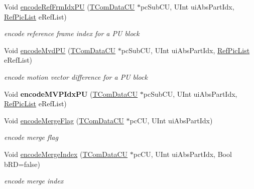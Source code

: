 \begin{DoxyCompactItemize}
Void \hyperlink{class_t_enc_entropy_a418fc6da3be935bad0780f1bc25d0ea0}{encode\+Ref\+Frm\+Idx\+PU} (\hyperlink{class_t_com_data_c_u}{T\+Com\+Data\+CU} $\ast$pc\+Sub\+CU, U\+Int ui\+Abs\+Part\+Idx, \hyperlink{_type_def_8h_a93cea48eb9dcfd661168dee82e41b384}{Ref\+Pic\+List} e\+Ref\+List)
\begin{DoxyCompactList}\small\item\em encode reference frame index for a PU block \end{DoxyCompactList}\item 
\mbox{\label{class_t_enc_entropy_a0b56c9db8fe066e8b5bda554b66e7402}} 
Void \hyperlink{class_t_enc_entropy_a0b56c9db8fe066e8b5bda554b66e7402}{encode\+Mvd\+PU} (\hyperlink{class_t_com_data_c_u}{T\+Com\+Data\+CU} $\ast$pc\+Sub\+CU, U\+Int ui\+Abs\+Part\+Idx, \hyperlink{_type_def_8h_a93cea48eb9dcfd661168dee82e41b384}{Ref\+Pic\+List} e\+Ref\+List)
\begin{DoxyCompactList}\small\item\em encode motion vector difference for a PU block \end{DoxyCompactList}\item 
\mbox{\label{class_t_enc_entropy_a42b735cd050b5e7ebe65fe9ccda434be}} 
Void {\bfseries encode\+M\+V\+P\+Idx\+PU} (\hyperlink{class_t_com_data_c_u}{T\+Com\+Data\+CU} $\ast$pc\+Sub\+CU, U\+Int ui\+Abs\+Part\+Idx, \hyperlink{_type_def_8h_a93cea48eb9dcfd661168dee82e41b384}{Ref\+Pic\+List} e\+Ref\+List)
\item 
\mbox{\label{class_t_enc_entropy_a546f8e7bc80b9bbde75875ce6d795616}} 
Void \hyperlink{class_t_enc_entropy_a546f8e7bc80b9bbde75875ce6d795616}{encode\+Merge\+Flag} (\hyperlink{class_t_com_data_c_u}{T\+Com\+Data\+CU} $\ast$pc\+CU, U\+Int ui\+Abs\+Part\+Idx)
\begin{DoxyCompactList}\small\item\em encode merge flag \end{DoxyCompactList}\item 
\mbox{\label{class_t_enc_entropy_a38ae7546cd038347f41ee84dc8e7714b}} 
Void \hyperlink{class_t_enc_entropy_a38ae7546cd038347f41ee84dc8e7714b}{encode\+Merge\+Index} (\hyperlink{class_t_com_data_c_u}{T\+Com\+Data\+CU} $\ast$pc\+CU, U\+Int ui\+Abs\+Part\+Idx, Bool b\+RD=false)
\begin{DoxyCompactList}\small\item\em encode merge index \end{DoxyCompactList}\item 

\end{DoxyCompactItemize}
